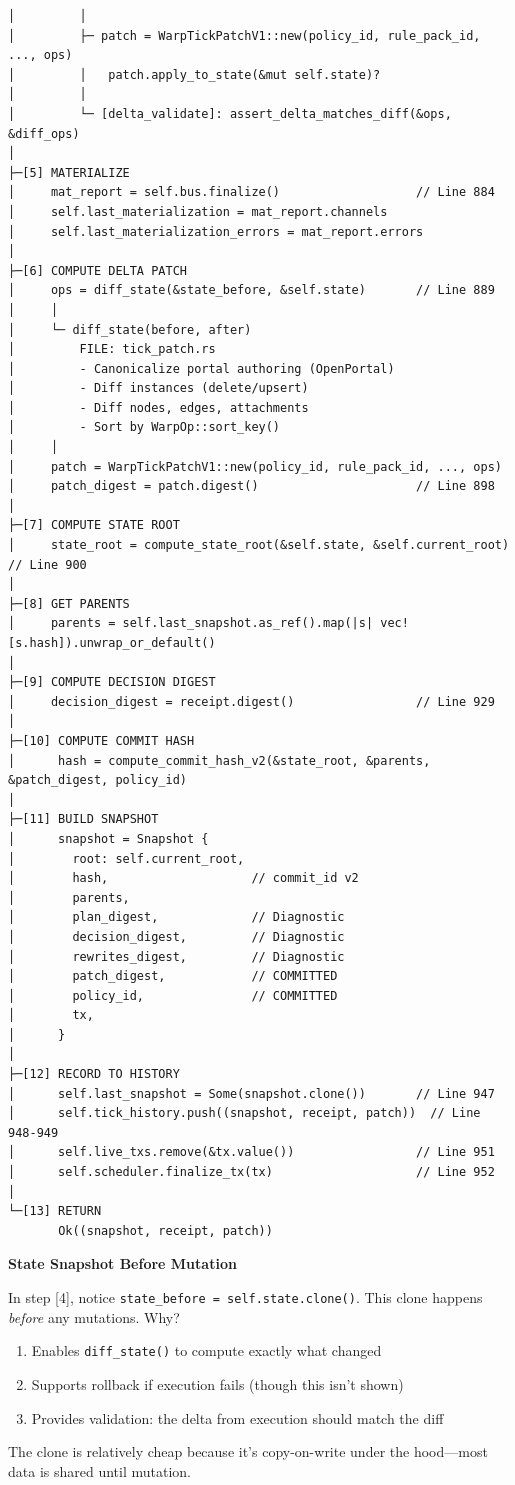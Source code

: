 \documentclass[11pt]{book}
\begin{document}
\begin{verbatim}
│         │
│         ├─ patch = WarpTickPatchV1::new(policy_id, rule_pack_id, ..., ops)
│         │   patch.apply_to_state(&mut self.state)?
│         │
│         └─ [delta_validate]: assert_delta_matches_diff(&ops, &diff_ops)
│
├─[5] MATERIALIZE
│     mat_report = self.bus.finalize()                   // Line 884
│     self.last_materialization = mat_report.channels
│     self.last_materialization_errors = mat_report.errors
│
├─[6] COMPUTE DELTA PATCH
│     ops = diff_state(&state_before, &self.state)       // Line 889
│     │
│     └─ diff_state(before, after)
│         FILE: tick_patch.rs
│         - Canonicalize portal authoring (OpenPortal)
│         - Diff instances (delete/upsert)
│         - Diff nodes, edges, attachments
│         - Sort by WarpOp::sort_key()
│     │
│     patch = WarpTickPatchV1::new(policy_id, rule_pack_id, ..., ops)
│     patch_digest = patch.digest()                      // Line 898
│
├─[7] COMPUTE STATE ROOT
│     state_root = compute_state_root(&self.state, &self.current_root)  // Line 900
│
├─[8] GET PARENTS
│     parents = self.last_snapshot.as_ref().map(|s| vec![s.hash]).unwrap_or_default()
│
├─[9] COMPUTE DECISION DIGEST
│     decision_digest = receipt.digest()                 // Line 929
│
├─[10] COMPUTE COMMIT HASH
│      hash = compute_commit_hash_v2(&state_root, &parents, &patch_digest, policy_id)
│
├─[11] BUILD SNAPSHOT
│      snapshot = Snapshot {
│        root: self.current_root,
│        hash,                    // commit_id v2
│        parents,
│        plan_digest,             // Diagnostic
│        decision_digest,         // Diagnostic
│        rewrites_digest,         // Diagnostic
│        patch_digest,            // COMMITTED
│        policy_id,               // COMMITTED
│        tx,
│      }
│
├─[12] RECORD TO HISTORY
│      self.last_snapshot = Some(snapshot.clone())       // Line 947
│      self.tick_history.push((snapshot, receipt, patch))  // Line 948-949
│      self.live_txs.remove(&tx.value())                 // Line 951
│      self.scheduler.finalize_tx(tx)                    // Line 952
│
└─[13] RETURN
       Ok((snapshot, receipt, patch))
\end{verbatim}

\begin{cleverpattern}
\textbf{State Snapshot Before Mutation}

In step [4], notice \texttt{state\_before = self.state.clone()}. This clone happens \emph{before} any mutations. Why?

\begin{enumerate}
\item Enables \texttt{diff\_state()} to compute exactly what changed
\item Supports rollback if execution fails (though this isn't shown)
\item Provides validation: the delta from execution should match the diff
\end{enumerate}

The clone is relatively cheap because it's copy-on-write under the hood---most data is shared until mutation.
\end{cleverpattern}
\end{document}
